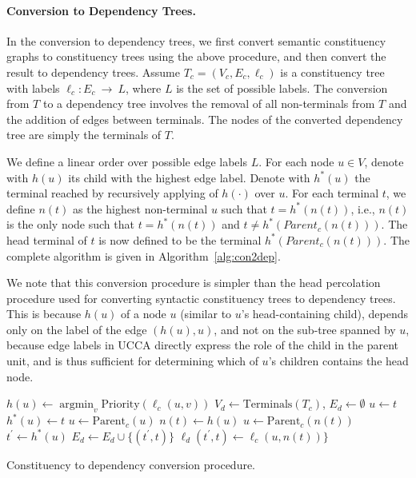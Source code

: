 \documentclass[11pt]{article}
\DeclareMathOperator*{\argmin}{argmin}
\begin{document}
\paragraph{Conversion to Dependency Trees.}\label{subsec:con2dep}
In the conversion to dependency trees, we first convert semantic constituency graphs
to constituency trees using the above procedure, and then convert the result to dependency trees. 
Assume $T_c=(V_c,E_c,\ell_c)$ is a constituency tree with labels $\ell_c:E_c~\rightarrow~L$,
where $L$ is the set of possible labels.
The conversion from $T$ to a dependency tree involves the removal of
all non-terminals from $T$ and the addition of edges between terminals.
The nodes of the converted dependency tree are simply the terminals of $T$.

We define a linear order over possible edge labels $L$.
For each node $u \in V$, denote with $h(u)$ its child with the highest edge label.
Denote with $h^*(u)$ the terminal reached by recursively applying of $h(\cdot)$ over $u$.
For each terminal $t$, we define $n(t)$ as the highest non-terminal $u$ such that $t=h^*(n(t))$, i.e.,
$n(t)$ is the only node such that $t=h^*(n(t))$ and $t \neq h^*(Parent_c(n(t)))$.
The head terminal of $t$ is now defined to be the terminal $h^*(Parent_c(n(t)))$.
The complete algorithm is given in Algorithm~\ref{alg:con2dep}.

We note that this conversion procedure is simpler than the
head percolation procedure used for converting syntactic constituency trees to dependency trees.
This is because $h(u)$ of a node $u$ (similar to $u$'s head-containing child),
depends only on the label of the edge $(h(u),u)$, and not on the sub-tree spanned by $u$,
because edge labels in UCCA directly express the role of the child in the parent unit, and
is thus sufficient for determining which of $u$'s children contains the head node.


\begin{algorithm}[t]
  {
  $h(u) \leftarrow \argmin_v \mathrm{Priority}(\ell_c(u,v))$\;
 }
 $V_d \leftarrow \mathrm{Terminals}({T_c})$,
 $E_d \leftarrow \emptyset$\;
  {
  $u \leftarrow t$\;
   {
  	$h^*(u) \leftarrow t$\;
  	$u \leftarrow \mathrm{Parent}_c(u)$\;
  }
  $n(t) \leftarrow h(u)$\;
 }
  {
  $u \leftarrow \mathrm{Parent}_c(n(t))$\;
  $t^\prime \leftarrow h^*(u)$\;
  $E_d \leftarrow E_d \cup \{(t^\prime, t)\}$\;
  $\ell_d (t^\prime, t) \leftarrow \ell_c(u, n(t))\}$\;
 }
 \caption{Constituency to dependency conversion procedure.}
 \label{alg:con2dep}
\end{algorithm}
\end{document}
